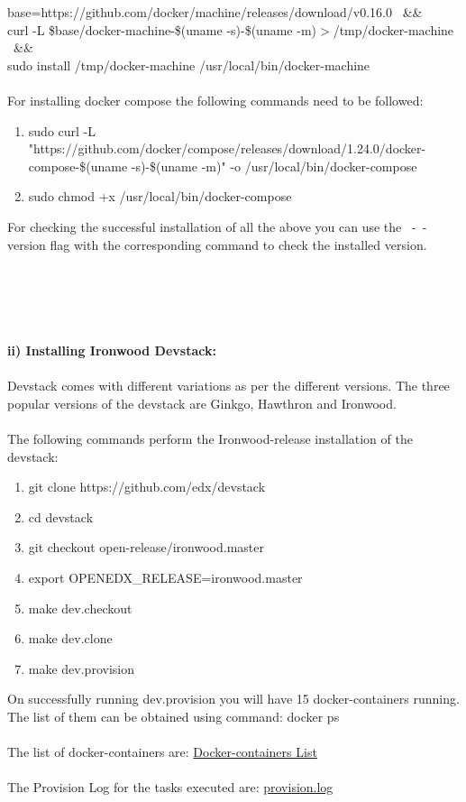 \documentclass[12pt]{article}
\begin{document}
	base=https://github.com/docker/machine/releases/download/v0.16.0 \ \&\& \\
	curl -L \$base/docker-machine-\$(uname -s)-\$(uname -m)$>$/tmp/docker-machine \ \&\& \\
	sudo install /tmp/docker-machine /usr/local/bin/docker-machine\\ \\
	For installing docker compose the following commands need to be followed:
	\begin{enumerate}
		\item sudo curl -L "https://github.com/docker/compose/releases/download/1.24.0/docker-compose-\$(uname -s)-\$(uname -m)" -o /usr/local/bin/docker-compose
		\item sudo chmod +x /usr/local/bin/docker-compose
	\end{enumerate}
	For checking the successful installation of all the above you can use the \ -\ -version flag with the corresponding command to check the installed version.\\\\\\\\\\\\
	\textbf{ii) Installing Ironwood Devstack:} \\ \\
	Devstack comes with different variations as per the different versions. The three popular versions of the devstack are Ginkgo, Hawthron and Ironwood. \\\\
	The following commands perform the Ironwood-release installation of the devstack:
	\begin{enumerate}
		\item git clone https://github.com/edx/devstack
		\item cd devstack
		\item git checkout open-release/ironwood.master
		\item export OPENEDX\_RELEASE=ironwood.master
		\item make dev.checkout
		\item make dev.clone
		\item make dev.provision
	\end{enumerate}
	On successfully running dev.provision you will have 15 docker-containers running. The list of them can be obtained using command:  docker ps
	\\\\
	The list of docker-containers are: \href{https://drive.google.com/open?id=0B168SrnPp4BpZ1RCQ1VncU81VEZYanl2SUNWN2dtRUg1bGRv}{Docker-containers List}
	\\\\
	The Provision Log for the tasks executed are: \href{https://drive.google.com/open?id=0B168SrnPp4BpclQ3d3gwbDNWLWtrUzduYUt6Vko4S2h6bzBz}{provision.log}
	
\end{document}

